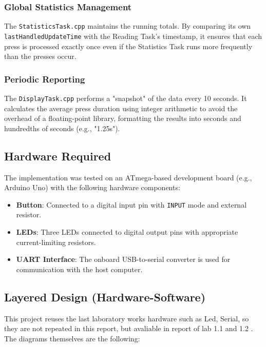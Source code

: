 \subsubsection{Global Statistics Management}
The \texttt{StatisticsTask.cpp} maintains the running totals. By comparing its own \texttt{lastHandledUpdateTime} with the Reading Task's timestamp, it ensures that each press is processed exactly once even if the Statistics Task runs more frequently than the presses occur.

\subsubsection{Periodic Reporting}
The \texttt{DisplayTask.cpp} performs a "snapshot" of the data every 10 seconds. It calculates the average press duration using integer arithmetic to avoid the overhead of a floating-point library, formatting the results into seconds and hundredths of seconds (e.g., "1.25s").

\subsection{Hardware Required}

The implementation was tested on an ATmega-based development board (e.g., Arduino Uno) with the following hardware components:

\begin{itemize}
    \item \textbf{Button}: Connected to a digital input pin with \texttt{INPUT} mode and external resistor.
    \item \textbf{LEDs}: Three LEDs connected to digital output pins with appropriate current-limiting resistors.
    \item \textbf{UART Interface}: The onboard USB-to-serial converter is used for communication with the host computer.
\end{itemize}


\subsection{Layered Design (Hardware-Software)}

This project reuses the last laboratory works hardware such as Led, Serial, so they are not repeated in this report, but avaliable in report of lab 1.1 and 1.2 \cite{lab1_1, lab1_2}. The diagrams themselves are the following:

